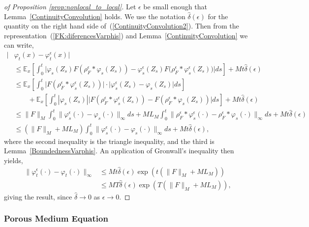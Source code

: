 \documentclass[EJP]{ejpecp} %
\newcommand{\IE}{\mathbb E}
\begin{document}
\begin{proof}[of Proposition \ref{prop:nonlocal_to_local}]
Let $\epsilon$ be small enough that Lemma~\ref{ContinuityConvolution} holds. 
We use the notation $\widehat{\delta}(\epsilon)$ for the quantity on the right hand side 
of~(\ref{ContinuityConvolution2}).
Then from the representation~(\ref{FK:diferencesVarphis}) 
and Lemma~\ref{ContinuityConvolution} we can write,
\begin{align*}
| &\varphi_t(x) - \varphi^\epsilon_t(x)|  \\ 
& \leq \IE_x\left[ \int_0^t\Big| \varphi_s(Z_s)
F(\rho^\epsilon_F*\varphi_s(Z_s))
-\varphi^\epsilon_s(Z_s)
F\big(\rho^\epsilon_F*\varphi^\epsilon_s(Z_s)\big)\Big| ds \right] 
+M t \widehat{\delta}(\epsilon)   \\ 
& \leq \IE_x\left[ \int_0^t \big|F(\rho^\epsilon_F*\varphi^\epsilon_s(Z_s))\big|\cdot
\big|\varphi^\epsilon_s(Z_s)-\varphi_s(Z_s)\big| ds  \right] \\ 
& \qquad +  \IE_x\left[\int_0^t |\varphi_s(Z_s)| 
\big|F(\rho^\epsilon_F*\varphi^\epsilon_s(Z_s))
-F(\rho^\epsilon_F*\varphi_s(Z_s))\big| ds \right] 
+ M t \widehat{\delta}(\epsilon)  \\ 
& \leq \| F \|_M \int_0^t \| \varphi^\epsilon_s(\cdot) 
- \varphi_s(\cdot) \|_\infty ds
  + M L_M \int_0^t \| \rho^\epsilon_F*\varphi^\epsilon_s(\cdot)
-\rho^\epsilon_F*\varphi_s(\cdot) \|_\infty ds 
+  M  t \widehat{\delta}(\epsilon)  \\ 
& \leq (\| F \|_M + M L_M) 
\int_0^t \| \varphi^\epsilon_s(\cdot) - \varphi_s(\cdot) \|_\infty ds 
+ M  t \widehat{\delta}(\epsilon),
\end{align*}
where the second inequality is the triangle inequality, 
and the third is Lemma~\ref{BoundednessVarphis}. 
An application of Gronwall's inequality then yields,
\begin{align*}
\| \varphi^\epsilon_t(\cdot)-\varphi_t(\cdot)\|_\infty 
&\leq M  t \widehat{\delta}(\epsilon)  
\exp(t (\| F \|_M + M L_M)) \\ 
& \leq  M  T \widehat{\delta}(\epsilon)  \exp(T(\| F \|_M + M L_M)),
\end{align*}
	giving the result, since $\widehat{\delta}\to 0$ as $\epsilon\to 0$.
\end{proof}


\subsubsection{Porous Medium Equation}
\label{sec:pme}
\end{document}
